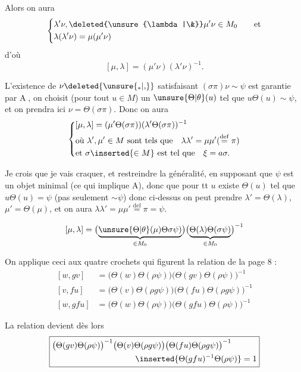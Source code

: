 Alors on aura
\[
\left\{\begin{aligned}&\lambda'\nu,\deleted{\unsure{\lambda|\&}}\mu'\nu\in M_0\qquad\text{et}\\ &\lambda(\lambda'\nu)=\mu(\mu'\nu)\end{aligned}\right.
\]
d'où
\[
[\mu,\lambda]=(\mu'\nu)(\lambda'\nu)^{-1}.
\]

L'existence de $\nu\deleted{\unsure{{}_{*}|{,}}}$ satisfaisant $(\sigma\pi)\nu\sim\psi$ est garantie par \textcircled{A}, on choisit (pour tout $u\in M$) un $\unsure{\Theta|\theta}(u)$ tel que $u\Theta(u)\sim\psi$, et on prendra ici $\nu=\Theta(\sigma\pi)$. Donc on aura
\[
\left\{\begin{aligned}&[\mu,\lambda]=(\mu'\Theta(\sigma\pi))(\lambda'\Theta(\sigma\pi))^{-1}\\ &\text{où }\lambda',\mu'\in M\ \text{sont tels que}\quad\lambda\lambda'=\mu\mu'(\overset{\mathrm{def}}{=}\pi)\\ &\text{et }\sigma\inserted{\in M}\ \text{est tel que}\quad\xi=a\sigma.\end{aligned}\right.
\]

Je crois que je vais craquer, et restreindre la généralité, en supposant  que $\psi$ est un objet minimal (ce qui implique A), donc que pour tt $u$ existe $\Theta(u)$ tel que $u\Theta(u)=\psi$ (pas seulement $\sim\psi$) donc ci-dessus on peut prendre $\lambda'=\Theta(\lambda)$, $\mu'=\Theta(\mu)$, et on aura $\lambda\lambda'=\mu\mu'\overset{\mathrm{def}}{=}\pi=\psi$.


\[
[\mu,\lambda]=\bigl(\underbrace{\unsure{\Theta|\theta}(\mu)\Theta\sigma\psi)}_{\in M_0}\bigr)\bigl(\underbrace{\Theta(\lambda)\Theta(\sigma\psi)}_{\in M_0}\bigr)^{-1}
\]

On applique ceci aux quatre crochets qui figurent  la relation de la page 8 :
\[
\begin{aligned}[w,gv]&=\bigl(\Theta(w)\Theta(\rho\psi)\bigr)\bigl(\Theta(gv)\Theta(\rho\psi)\bigr)^{-1}\\ [v,fu]&=\bigl(\Theta(v)\Theta(\rho g\psi)\bigr)\bigl(\Theta(fu)\Theta(\rho g\psi)\bigr)^{-1}\\ [w,gfu]&=\bigl(\Theta(w)\Theta(\rho\psi)\bigr)\bigl(\Theta(gfu)\Theta(\rho\psi)\bigr)^{-1}\end{aligned}
\]

La relation devient dès lors
\[
\boxed{\begin{aligned}&\bigl(\Theta(gv)\Theta(\rho\psi)\bigr)^{-1}\bigl(\Theta(v)\Theta(\rho g\psi)\bigr)\bigl(\Theta(fu)\Theta(\rho g\psi)\bigr)^{-1}\\ &\hspace{10em}\inserted{\Theta(gfu)^{-1}\Theta(\rho\psi)}=1\end{aligned}}
\]

